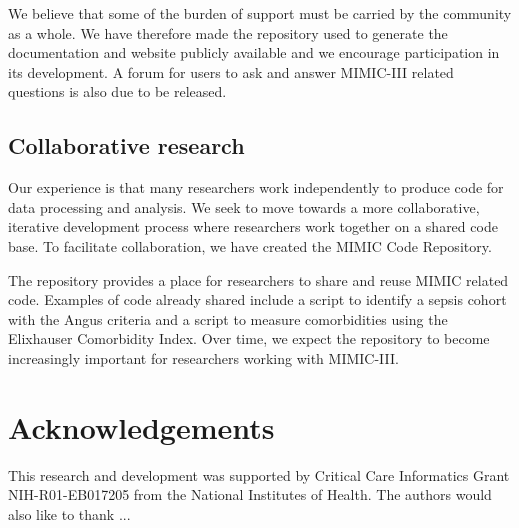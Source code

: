 \documentclass[english]{article}
\begin{document}
We believe that some of the burden of support must be carried by the community as a whole. We have therefore made the repository used to generate the documentation and website publicly available and we encourage participation in its development. A forum for users to ask and answer MIMIC-III related questions is also due to be released.


\subsection*{Collaborative research}

Our experience is that many researchers work independently to produce code for data processing and analysis. We seek to move towards a more collaborative, iterative development process where researchers work together on a shared code base. To facilitate collaboration, we have created the MIMIC Code Repository.

The repository provides a place for researchers to share and reuse MIMIC related code. Examples of code already shared include a script to identify a sepsis cohort with the Angus criteria and a script to measure comorbidities using the Elixhauser Comorbidity Index. Over time, we expect the repository to become increasingly important for researchers working with MIMIC-III.


\section*{Acknowledgements}


This research and development was supported by Critical Care Informatics Grant NIH-R01-EB017205 from the National Institutes of Health. The authors would also like to thank ...
\end{document}
